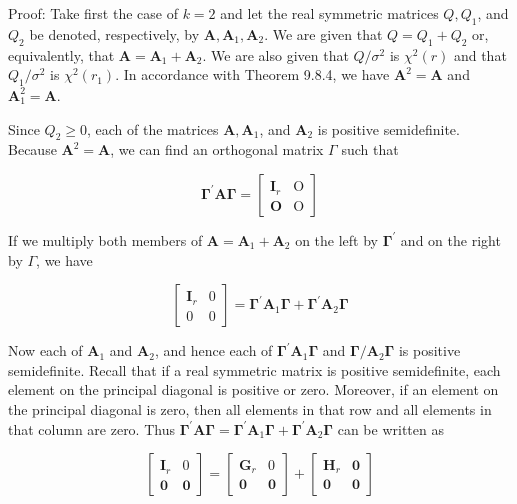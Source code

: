 Proof: Take first the case of $k=2$ and let the real symmetric matrices $Q, Q_{1}$, and $Q_{2}$ be denoted, respectively, by $\boldsymbol{A}, \boldsymbol{A}_{1}, \boldsymbol{A}_{2}$. We are given that $Q=Q_{1}+Q_{2}$ or, equivalently, that $\boldsymbol{A}=\boldsymbol{A}_{1}+\boldsymbol{A}_{2}$. We are also given that $Q / \sigma^{2}$ is $\chi^{2}(r)$ and that $Q_{1} / \sigma^{2}$ is $\chi^{2}\left(r_{1}\right)$. In accordance with Theorem 9.8.4, we have $\boldsymbol{A}^{2}=\boldsymbol{A}$ and $\boldsymbol{A}_{1}^{2}=\boldsymbol{A}$.

Since $Q_{2} \geq 0$, each of the matrices $\boldsymbol{A}, \boldsymbol{A}_{1}$, and $\boldsymbol{A}_{2}$ is positive semidefinite. Because $\boldsymbol{A}^{2}=\boldsymbol{A}$, we can find an orthogonal matrix $\Gamma$ such that

$$
\boldsymbol{\Gamma}^{\prime} \boldsymbol{A} \boldsymbol{\Gamma}=\left[\begin{array}{ll}
\mathbf{I}_{r} & \mathrm{O} \\
\mathbf{O} & \mathrm{O}
\end{array}\right]
$$

If we multiply both members of $\boldsymbol{A}=\boldsymbol{A}_{1}+\boldsymbol{A}_{2}$ on the left by $\boldsymbol{\Gamma}^{\prime}$ and on the right by $\Gamma$, we have

$$
\left[\begin{array}{cc}
\boldsymbol{I}_{r} & 0 \\
0 & 0
\end{array}\right]=\boldsymbol{\Gamma}^{\prime} \boldsymbol{A}_{1} \boldsymbol{\Gamma}+\boldsymbol{\Gamma}^{\prime} \boldsymbol{A}_{2} \boldsymbol{\Gamma}
$$

Now each of $\boldsymbol{A}_{1}$ and $\boldsymbol{A}_{2}$, and hence each of $\boldsymbol{\Gamma}^{\prime} \boldsymbol{A}_{1} \boldsymbol{\Gamma}$ and $\boldsymbol{\Gamma} / \boldsymbol{A}_{2} \boldsymbol{\Gamma}$ is positive semidefinite. Recall that if a real symmetric matrix is positive semidefinite, each element on the principal diagonal is positive or zero. Moreover, if an element on the principal diagonal is zero, then all elements in that row and all elements in that column are zero. Thus $\boldsymbol{\Gamma}^{\prime} \boldsymbol{A} \boldsymbol{\Gamma}=\boldsymbol{\Gamma}^{\prime} \boldsymbol{A}_{1} \boldsymbol{\Gamma}+\boldsymbol{\Gamma}^{\prime} \boldsymbol{A}_{2} \boldsymbol{\Gamma}$ can be written as

\[
\left[\begin{array}{cc}
\boldsymbol{I}_{r} & 0  \tag{9.9.13}\\
\mathbf{0} & \mathbf{0}
\end{array}\right]=\left[\begin{array}{cc}
\boldsymbol{G}_{r} & 0 \\
\mathbf{0} & \mathbf{0}
\end{array}\right]+\left[\begin{array}{cc}
\boldsymbol{H}_{r} & \mathbf{0} \\
\mathbf{0} & \mathbf{0}
\end{array}\right]
\]

